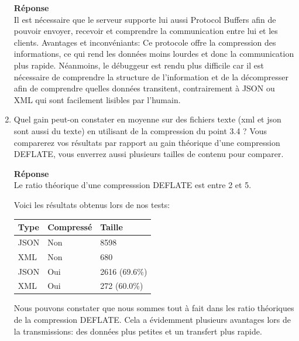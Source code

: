 \documentclass[a4paper]{article}
\begin{document}
\begin{enumerate}
    \textbf{Réponse} \\
    Il est nécessaire que le serveur supporte lui aussi Protocol Buffers afin de pouvoir envoyer, recevoir et comprendre la communication entre lui et les clients.
    Avantages et inconvéniants: Ce protocole offre la compression des informations, ce qui rend les données moins lourdes et donc la communication plus rapide. Néanmoins, le débuggeur est rendu plus difficile car il est nécessaire de comprendre la structure de l'information et de la décompresser afin de comprendre quelles données transitent, contrairement à JSON ou XML qui sont facilement lisibles par l'humain.
    
    \item Quel gain peut-on constater en moyenne sur des fichiers texte (xml et json sont aussi du texte) en utilisant de la compression du point 3.4 ? Vous comparerez vos résultats par rapport au gain théorique d’une compression DEFLATE, vous enverrez aussi plusieurs tailles de contenu pour comparer.
    
    \textbf{Réponse} \\
    Le ratio théorique d'une compresssion DEFLATE est entre 2 et 5.
    
    Voici les résultats obtenus lors de nos tests:
    \\
    \begin{center}
        \begin{tabular}{|l|l|l|}
            \hline
            \textbf{Type} & \textbf{Compressé} & \textbf{Taille}
            \\
            \hline
            JSON & Non & 8598
            \\
            \hline
            XML & Non & 680
            \\
            \hline
            JSON & Oui & 2616 (69.6\%)
            \\
            \hline
            XML & Oui & 272 (60.0\%)
            \\
            \hline
        \end{tabular}
    \end{center}
    
    Nous pouvons constater que nous sommes tout à fait dans les ratio théoriques de la compression DEFLATE. Cela a évidemment plusieurs avantages lors de la transmissions: des données plus petites et un transfert plus rapide.
    
\end{enumerate}
\end{document}
